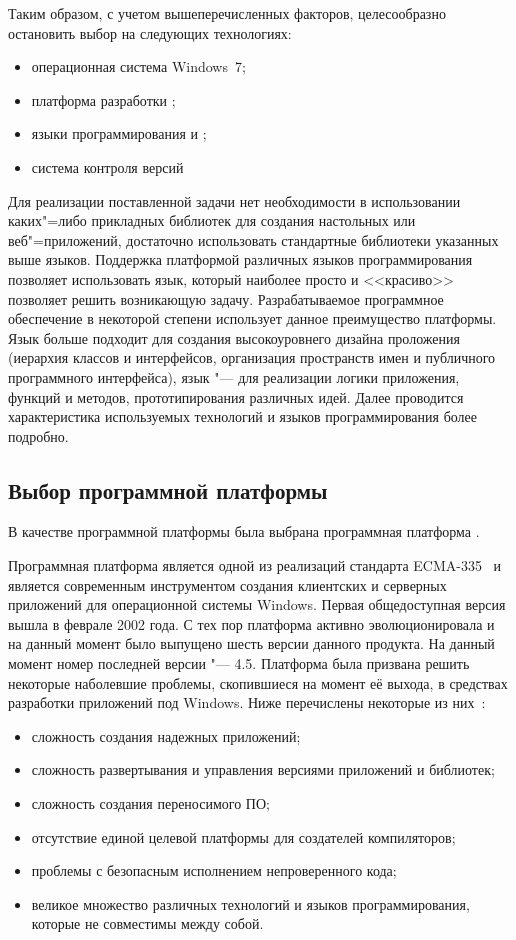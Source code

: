Таким образом, с учетом вышеперечисленных факторов, целесообразно остановить выбор на следующих технологиях:
\begin{itemize}
  \item операционная система Windows~7;
  \item платформа разработки \dotnet{};
  \item языки программирования \csharp{} и \js{};
  \item система контроля версий \git{}
\end{itemize}
Для реализации поставленной задачи нет необходимости в использовании каких"=либо прикладных библиотек для создания настольных или веб"=приложений, достаточно использовать стандартные библиотеки указанных выше языков.
Поддержка платформой \dotnet{} различных языков программирования позволяет использовать язык, который наиболее просто и <<красиво>> позволяет решить возникающую задачу.
Разрабатываемое программное обеспечение в некоторой степени использует данное преимущество платформы.
Язык \csharp{} больше подходит для создания высокоуровнего дизайна проложения (иерархия классов и интерфейсов, организация пространств имен и публичного программного интерфейса), язык \fsharp{} "--- для реализации логики приложения, функций и методов, прототипирования различных идей.
Далее проводится характеристика используемых технологий и языков программирования более подробно.

\subsection{Выбор программной платформы }
\label{sub:practice:platforma}

В качестве программной платформы была выбрана программная платформа \dotnet{}.

Программная платформа \dotnet{} является одной из реализаций стандарта ECMA-335~\cite{ecma_335} и является современным инструментом создания клиентских и серверных приложений для операционной системы Windows.
Первая общедоступная версия \netfx{} вышла в феврале 2002 года.
С тех пор платформа активно эволюционировала и на данный момент было выпущено шесть версии данного продукта.
На данный момент номер последней версии \netfx{} "--- 4.5.
Платформа \dotnet{} была призвана решить некоторые наболевшие проблемы, скопившиеся на момент её выхода, в средствах разработки приложений под Windows. 
Ниже перечислены некоторые из них~\cite[с.~\,--\,]{richter_2007_ru}:
\begin{itemize}
  \item сложность создания надежных приложений;
  \item сложность развертывания и управления версиями приложений и библиотек;
  \item сложность создания переносимого ПО;
  \item отсутствие единой целевой платформы для создателей компиляторов;
  \item проблемы с безопасным исполнением непроверенного кода;
  \item великое множество различных технологий и языков программирования, которые не совместимы между собой.
\end{itemize}

